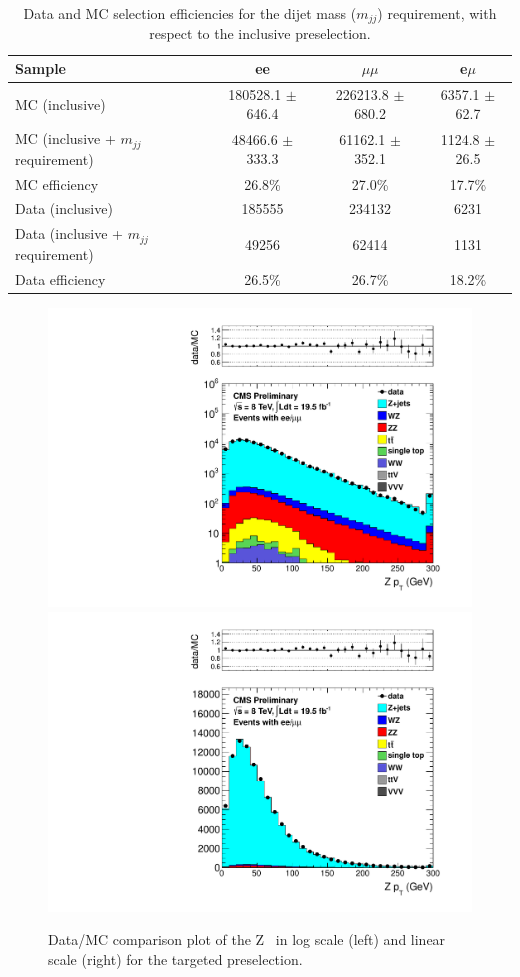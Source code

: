 \begin{table}[!hb]
\begin{center}
\caption{\label{table:mjj} Data and MC selection efficiencies for the dijet mass ($m_{jj}$) requirement, with respect
to the inclusive preselection.
}
\begin{tabular}{l|c|c|c}
\hline
\hline
Sample & ee & $\mu\mu$ & e$\mu$ \\
\hline
MC (inclusive)                           &180528.1 $\pm$ 646.4   &226213.8 $\pm$ 680.2   &6357.1 $\pm$ 62.7   \\
MC (inclusive + $m_{jj}$ requirement)   &48466.6 $\pm$ 333.3    &61162.1 $\pm$ 352.1   &1124.8 $\pm$ 26.5  \\
MC  efficiency  &               26.8\%  &     27.0\%  & 17.7\% \\
\hline
Data (inclusive)                           &         185555   &         234132   &           6231    \\
Data (inclusive + $m_{jj}$ requirement)   &          49256   &          62414   &           1131    \\
Data efficiency                            &          26.5\%    &       26.7\%   &            18.2\%  \\
\hline
\hline

\end{tabular}
\end{center}
\end{table}

\clearpage

\begin{figure}[!ht]
  \begin{center}
	\includegraphics[width=0.45\linewidth]{plots/zpt_targeted_log.pdf}
	\includegraphics[width=0.45\linewidth]{plots/Zpt_targted_linear.pdf}
	\caption{
	  \label{fig:zpt}\protect 
Data/MC comparison plot of the Z \pt\ in log scale (left) and linear scale (right) for the targeted preselection.
}                   
  \end{center}
\end{figure}
